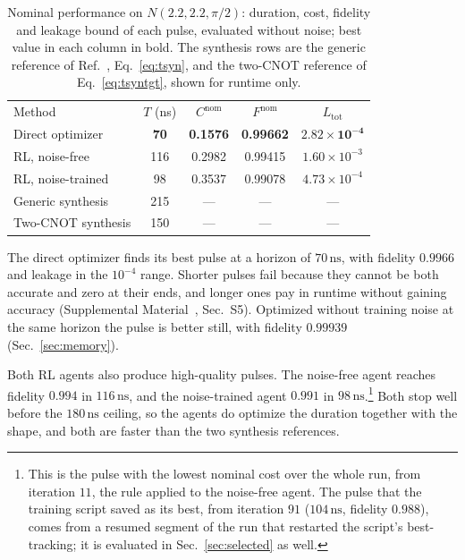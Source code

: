 \documentclass[aps,prx,twocolumn,superscriptaddress,nofootinbib,amsmath,amssymb,floatfix]{revtex4-2}
\newcommand{\Ntgt}[2]{N(#1,#1,#2)}
\newcommand{\Ltot}{L_{\mathrm{tot}}}
\newcommand{\ns}{\,\mathrm{ns}}
\begin{document}
\begin{table}[t]
\caption{Nominal performance on $\Ntgt{2.2}{\pi/2}$: duration, cost, fidelity and leakage bound of each
pulse, evaluated without noise; best value in each column in bold. The synthesis rows are the generic
reference of Ref.~\cite{Niu2019}, Eq.~\eqref{eq:tsyn}, and the two-CNOT reference of
Eq.~\eqref{eq:tsyntgt}, shown for runtime only.}
\label{tab:single}
\footnotesize
\begin{ruledtabular}
\begin{tabular}{lcccc}
Method & $T$ (ns) & $C^{\mathrm{nom}}$ & $F^{\mathrm{nom}}$ & $\Ltot$ \\
\colrule
Direct optimizer     & \textbf{70} & \textbf{0.1576} & \textbf{0.99662} & $\bm{2.82\times10^{-4}}$ \\
RL, noise-free       & 116         & 0.2982          & 0.99415          & $1.60\times10^{-3}$ \\
RL, noise-trained    & 98          & 0.3537          & 0.99078          & $4.73\times10^{-4}$ \\
\colrule
Generic synthesis    & 215         & ---             & ---              & --- \\
Two-CNOT synthesis   & 150         & ---             & ---              & --- \\
\end{tabular}
\end{ruledtabular}
\end{table}

The direct optimizer finds its best pulse at a horizon of $70\ns$, with fidelity $0.9966$ and leakage in
the $10^{-4}$ range. Shorter pulses fail because they cannot be both accurate and zero at their ends, and
longer ones pay in runtime without gaining accuracy (Supplemental Material~\cite{supp}, Sec.~S5). Optimized without
training noise at the same horizon the pulse is better still, with fidelity $0.99939$
(Sec.~\ref{sec:memory}).

Both RL agents also produce high-quality pulses. The noise-free agent reaches fidelity $0.994$ in
$116\ns$, and the noise-trained agent $0.991$ in $98\ns$.\footnote{This is the pulse with the lowest
nominal cost over the whole run, from iteration $11$, the rule applied to the noise-free agent. The pulse
that the training script saved as its best, from iteration $91$ ($104\ns$, fidelity $0.988$), comes from a
resumed segment of the run that restarted the script's best-tracking; it is evaluated in
Sec.~\ref{sec:selected} as well.} Both stop well before the $180\ns$ ceiling, so the agents do optimize
the duration together with the shape, and both are faster than the two synthesis references.
\end{document}
